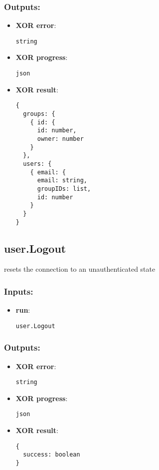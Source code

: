 \subsubsection*{Outputs:}
\begin{itemize}
    \item \textbf{XOR error}: 
\begin{lstlisting}
string
\end{lstlisting}
    \item \textbf{XOR progress}: 
\begin{lstlisting}
json
\end{lstlisting}
    \item \textbf{XOR result}: 
\begin{lstlisting}
{
  groups: {
    { id: {
      id: number, 
      owner: number
    }
  }, 
  users: {
    { email: {
      email: string, 
      groupIDs: list, 
      id: number
    }
  }
}
\end{lstlisting}
  \end{itemize}

\subsection{user.Logout}
\label{ch:builtinservices:user.Logout}
resets the connection to an unauthenticated state
\subsubsection*{Inputs:}
\begin{itemize}
    \item \textbf{run}: 
\begin{lstlisting}
user.Logout
\end{lstlisting}
  \end{itemize}

\subsubsection*{Outputs:}
\begin{itemize}
    \item \textbf{XOR error}: 
\begin{lstlisting}
string
\end{lstlisting}
    \item \textbf{XOR progress}: 
\begin{lstlisting}
json
\end{lstlisting}
    \item \textbf{XOR result}: 
\begin{lstlisting}
{
  success: boolean
}
\end{lstlisting}
  \end{itemize}

